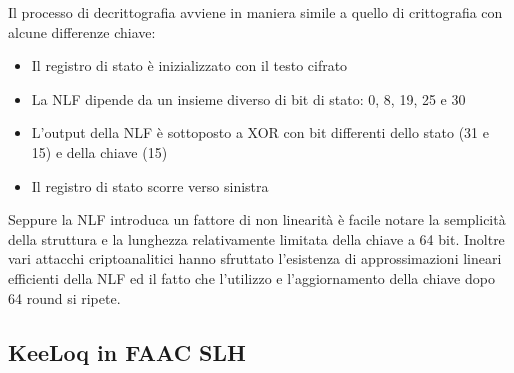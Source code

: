 Il processo di decrittografia avviene in maniera simile a quello di crittografia con alcune differenze chiave:
\begin{itemize}
  \item Il registro di stato è inizializzato con il testo cifrato
  \item La NLF dipende da un insieme diverso di bit di stato: 0, 8, 19, 25 e 30
  \item L’output della NLF è sottoposto a XOR con bit differenti dello stato (31 e 15) e della chiave (15)
  \item Il registro di stato scorre verso sinistra
\end{itemize}
Seppure la NLF introduca un fattore di non linearità è facile notare la semplicità della struttura e la lunghezza relativamente limitata della chiave a 64 bit. Inoltre vari attacchi criptoanalitici hanno sfruttato l’esistenza di approssimazioni lineari efficienti della NLF ed il fatto che l’utilizzo e l’aggiornamento della chiave dopo 64 round si ripete.

\subsection{KeeLoq in FAAC SLH}
\label{sub:faacslh}

